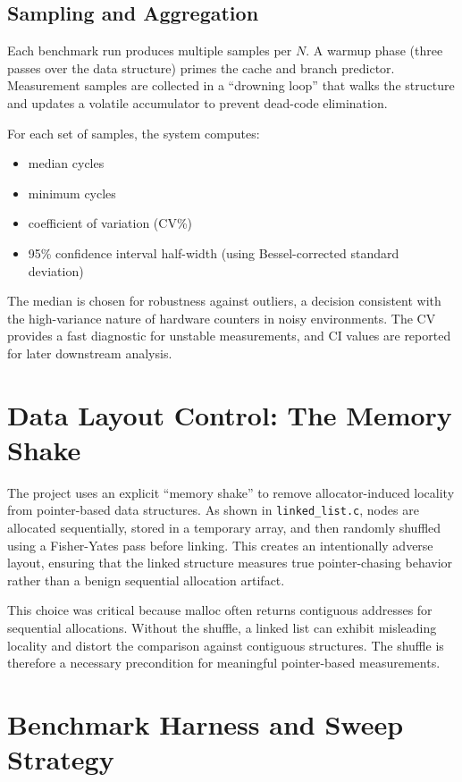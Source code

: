 \documentclass[11pt]{article}
\begin{document}
\subsection{Sampling and Aggregation}
Each benchmark run produces multiple samples per \(N\). A warmup phase (three passes over the data structure) primes the cache and branch predictor. Measurement samples are collected in a ``drowning loop'' that walks the structure and updates a volatile accumulator to prevent dead-code elimination. 

For each set of samples, the system computes:
\begin{itemize}
    \item median cycles
    \item minimum cycles
    \item coefficient of variation (CV\%)
    \item 95\% confidence interval half-width (using Bessel-corrected standard deviation)
\end{itemize}
The median is chosen for robustness against outliers, a decision consistent with the high-variance nature of hardware counters in noisy environments. The CV provides a fast diagnostic for unstable measurements, and CI values are reported for later downstream analysis.

\section{Data Layout Control: The Memory Shake}
The project uses an explicit ``memory shake'' to remove allocator-induced locality from pointer-based data structures. As shown in \texttt{linked\_list.c}, nodes are allocated sequentially, stored in a temporary array, and then randomly shuffled using a Fisher-Yates pass before linking. This creates an intentionally adverse layout, ensuring that the linked structure measures true pointer-chasing behavior rather than a benign sequential allocation artifact.

This choice was critical because malloc often returns contiguous addresses for sequential allocations. Without the shuffle, a linked list can exhibit misleading locality and distort the comparison against contiguous structures. The shuffle is therefore a necessary precondition for meaningful pointer-based measurements.

\section{Benchmark Harness and Sweep Strategy}
\end{document}
